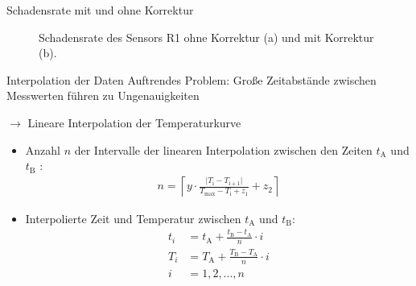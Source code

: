 \documentclass[aspectratio=43, 10pt]{beamer}
\begin{document}
\begin{frame}{Schadensrate mit und ohne Korrektur}
  \begin{figure}
  \caption{Schadensrate des Sensors R1 ohne Korrektur (a) und mit Korrektur (b).}
  \end{figure}
\end{frame}


\begin{frame}{Interpolation der Daten}
  Auftrendes Problem: Große Zeitabstände zwischen Messwerten führen zu Ungenauigkeiten
  \medskip

  $\rightarrow$ Lineare Interpolation der Temperaturkurve
  \medskip
  \begin{itemize}
    \item Anzahl $n$ der Intervalle der linearen Interpolation zwischen den Zeiten $t_{\mathrm{A}}$ und $t_{\mathrm{B}}$ :
    \begin{align*}
      n = \left\lceil y \cdot \frac{\bigl|T_{\mathrm{i}}-T_{\mathrm{i+1}}\bigl|}{T_{\mathrm{max}}-T_{\mathrm{i}}+ z_1}+z_2 \right\rceil
    \end{align*}

    \item Interpolierte Zeit und Temperatur zwischen $t_{\mathrm{A}}$ und $t_{\mathrm{B}}$:
    \begin{align*}
      t_i &= t_{\mathrm{A}} +  \frac{t_{\mathrm{B}}-t_{\mathrm{A}}}{n} \cdot i \\
      T_i &= T_{\mathrm{A}} +  \frac{T_{\mathrm{B}}-T_{\mathrm{A}}}{n} \cdot i \\
      i &= 1, 2, ..., n
    \end{align*}
  \end{itemize}
\end{frame}
\end{document}
